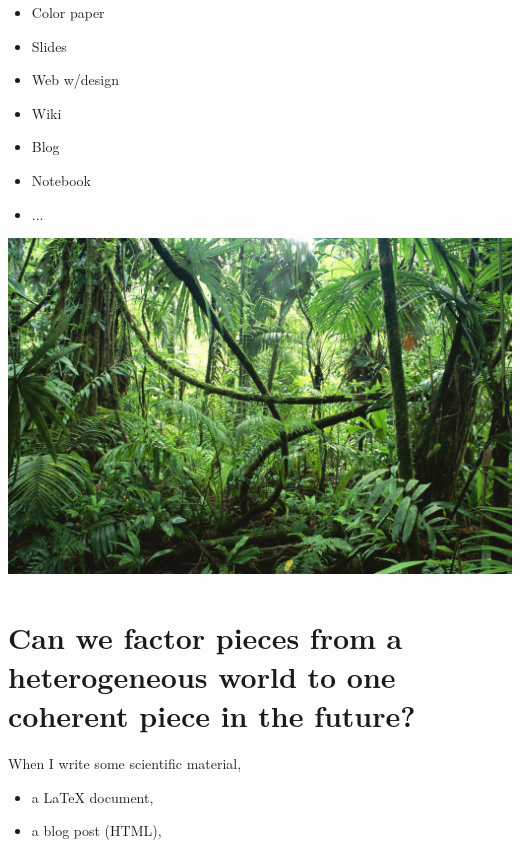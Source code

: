 \documentclass[%
twoside,                 %
draft,                   %
final,                   %
chapterprefix=true,      %
open=right               %
10pt]{book}
\begin{document}
\begin{shadedquoteBlue}
\begin{itemize}
 \item Color paper

 \item Slides

 \item Web w/design

 \item Wiki

 \item Blog

 \item Notebook

 \item ...
\end{itemize}

\noindent


\begin{center}  %
  \centerline{\includegraphics[width=0.9\linewidth]{fig/jungle_with_mess.jpg}}
\end{center}



\section*{Can we factor pieces from a heterogeneous world to one coherent piece in the future?}

When I write some scientific material,

\begin{itemize}
 \item a {\LaTeX} document,

 \item a blog post (HTML),


\end{itemize}
\end{shadedquoteBlue}
\end{document}

